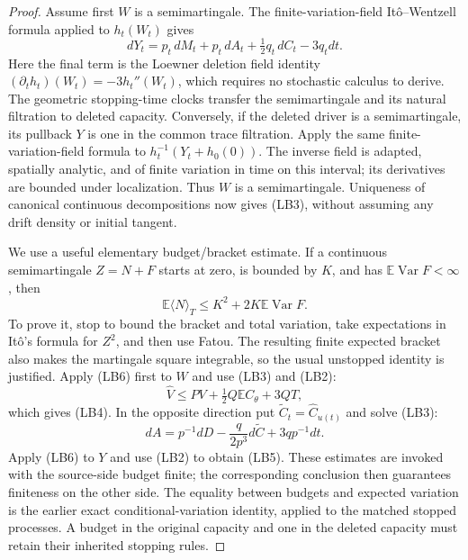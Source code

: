 \documentclass[11pt]{article}
\theoremstyle{definition}\newtheorem{definition}[theorem]{Definition}
\theoremstyle{remark}\newtheorem{remark}[theorem]{Remark}
\begin{document}
\begin{proof}
Assume first $W$ is a semimartingale. The finite-variation-field
It\^o--Wentzell formula applied to $h_t(W_t)$ gives
\[
 dY_t=p_t\,dM_t+p_t\,dA_t+\tfrac12q_t\,dC_t-3q_tdt.
\]
Here the final term is the Loewner deletion field identity
$(\partial_t h_t)(W_t)=-3h_t''(W_t)$, which requires no stochastic
calculus to derive. The geometric stopping-time clocks transfer the
semimartingale and its natural filtration to deleted capacity. Conversely,
if the deleted driver is a semimartingale, its pullback $Y$ is one in
the common trace filtration. Apply the same finite-variation-field
formula to $h_t^{-1}(Y_t+h_0(0))$. The inverse field is adapted,
spatially analytic, and of finite variation in time on this interval;
its derivatives are bounded under localization. Thus $W$ is a
semimartingale. Uniqueness of canonical continuous decompositions now
gives (LB3), without assuming any drift density or initial tangent.

We use a useful elementary budget/bracket estimate. If a continuous
semimartingale $Z=N+F$ starts at zero, is bounded by $K$, and has
$\mathbb E\operatorname{Var}F<\infty$, then
\[
 \mathbb E\langle N\rangle_T
   \le K^2+2K\mathbb E\operatorname{Var}F.
 \tag{LB6}
\]
To prove it, stop to bound the bracket and total variation, take
expectations in It\^o's formula for $Z^2$, and then use Fatou.
The resulting finite expected bracket also makes the martingale
square integrable, so the usual unstopped identity is justified.
Apply (LB6) first to $W$ and use (LB3) and (LB2):
\[
 \widehat V\le P V+\tfrac12Q\mathbb E C_\theta+3QT,
\]
which gives (LB4). In the opposite direction put
$\widetilde C_t=\widehat C_{u(t)}$ and solve (LB3):
\[
 dA=p^{-1}dD-\frac{q}{2p^3}d\widetilde C+3q p^{-1}dt.
\]
Apply (LB6) to $Y$ and use (LB2) to obtain (LB5). These estimates
are invoked with the source-side budget finite; the corresponding
conclusion then guarantees finiteness on the other side. The equality
between budgets and expected variation is the earlier exact
conditional-variation identity, applied to the matched stopped
processes. A budget in the original capacity and one in the deleted
capacity must retain their inherited stopping rules.
\end{proof}
\end{document}

